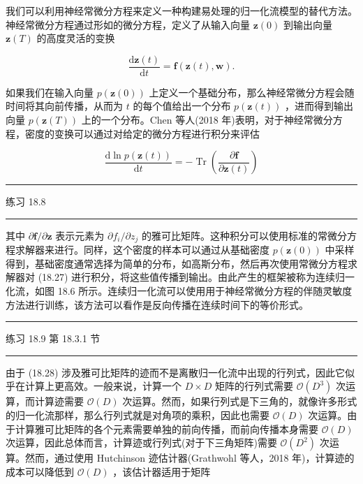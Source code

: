 \documentclass[10pt]{report}
\newcommand{\HRule}{\begin{center}\rule{0.9\linewidth}{0.2mm}\end{center}}
\begin{document}
我们可以利用神经常微分方程来定义一种构建易处理的归一化流模型的替代方法。神经常微分方程通过形如的微分方程，定义了从输入向量 \(\mathbf{z}\left( 0\right)\) 到输出向量 \(\mathbf{z}\left( T\right)\) 的高度灵活的变换

\[
\frac{\mathrm{d}\mathbf{z}\left( t\right) }{\mathrm{d}t} = \mathbf{f}\left( {\mathbf{z}\left( t\right) ,\mathbf{w}}\right) . \tag{18.27}
\]

如果我们在输入向量 \(p\left( {\mathbf{z}\left( 0\right) }\right)\) 上定义一个基础分布，那么神经常微分方程会随时间将其向前传播，从而为 \(t\) 的每个值给出一个分布 \(p\left( {\mathbf{z}\left( t\right) }\right)\) ，进而得到输出向量 \(p\left( {\mathbf{z}\left( T\right) }\right)\) 上的一个分布。Chen 等人(2018 年)表明，对于神经常微分方程，密度的变换可以通过对给定的微分方程进行积分来评估

\[
\frac{\mathrm{d}\ln p\left( {\mathbf{z}\left( t\right) }\right) }{\mathrm{d}t} =  - \operatorname{Tr}\left( \frac{\partial \mathbf{f}}{\partial \mathbf{z}\left( t\right) }\right)  \tag{18.28}
\]

\HRule

练习 18.8

\HRule

其中 \(\partial \mathbf{f}/\partial \mathbf{z}\) 表示元素为 \(\partial {f}_{i}/\partial {z}_{j}\) 的雅可比矩阵。这种积分可以使用标准的常微分方程求解器来进行。同样，这个密度的样本可以通过从基础密度 \(p\left( {\mathbf{z}\left( 0\right) }\right)\) 中采样得到，基础密度通常选择为简单的分布，如高斯分布，然后再次使用常微分方程求解器对 (18.27) 进行积分，将这些值传播到输出。由此产生的框架被称为连续归一化流，如图 18.6 所示。连续归一化流可以使用用于神经常微分方程的伴随灵敏度方法进行训练，该方法可以看作是反向传播在连续时间下的等价形式。

\HRule

练习 18.9 第 18.3.1 节

\HRule

由于 (18.28) 涉及雅可比矩阵的迹而不是离散归一化流中出现的行列式，因此它似乎在计算上更高效。一般来说，计算一个 \(D \times  D\) 矩阵的行列式需要 \(\mathcal{O}\left( {D}^{3}\right)\) 次运算，而计算迹需要 \(\mathcal{O}\left( D\right)\) 次运算。然而，如果行列式是下三角的，就像许多形式的归一化流那样，那么行列式就是对角项的乘积，因此也需要 \(\mathcal{O}\left( D\right)\) 次运算。由于计算雅可比矩阵的各个元素需要单独的前向传播，而前向传播本身需要 \(\mathcal{O}\left( D\right)\) 次运算，因此总体而言，计算迹或行列式(对于下三角矩阵)需要 \(\mathcal{O}\left( {D}^{2}\right)\) 次运算。然而，通过使用 Hutchinson 迹估计器(Grathwohl 等人，2018 年)，计算迹的成本可以降低到 \(\mathcal{O}\left( D\right)\) ，该估计器适用于矩阵
\end{document}
